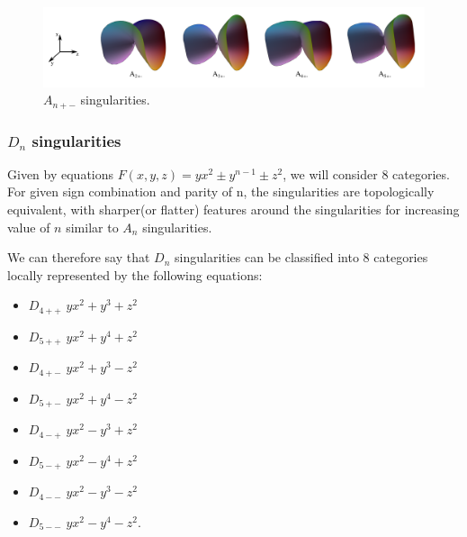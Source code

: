 \begin{definition}
\begin{figure}
    \centerline{\includegraphics[width=1\textwidth]{images/img5}}
    \caption[$A_{n+-}$ singularities]
    {$A_{n+-}$ singularities. \cite{singsurf}}
    \label{img:5}
\end{figure}

\subsubsection*{$D_n$ singularities}

Given by equations $F(x,y,z)=yx^2\pm y^{n-1}\pm z^2$, we will consider 8 categories.
For given sign combination and parity of n, the singularities are topologically
equivalent, with sharper(or flatter) features around the singularities for increasing
value of $n$ similar to $A_n$ singularities.

We can therefore say that $D_n$ singularities can be classified into 8 categories
locally represented by the following equations:
\begin{itemize}
    \item $D_{4++}$ \hspace{5mm} $yx^2 + y^3 + z^2$
    \item $D_{5++}$ \hspace{5mm} $yx^2 + y^4 + z^2$
    \item $D_{4+-}$ \hspace{5mm} $yx^2 + y^3 - z^2$
    \item $D_{5+-}$ \hspace{5mm} $yx^2 + y^4 - z^2$
    \item $D_{4-+}$ \hspace{5mm} $yx^2 - y^3 + z^2$
    \item $D_{5-+}$ \hspace{5mm} $yx^2 - y^4 + z^2$
    \item $D_{4--}$ \hspace{5mm} $yx^2 - y^3 - z^2$
    \item $D_{5--}$ \hspace{5mm} $yx^2 - y^4 - z^2$.
\end{itemize}


\end{definition}
